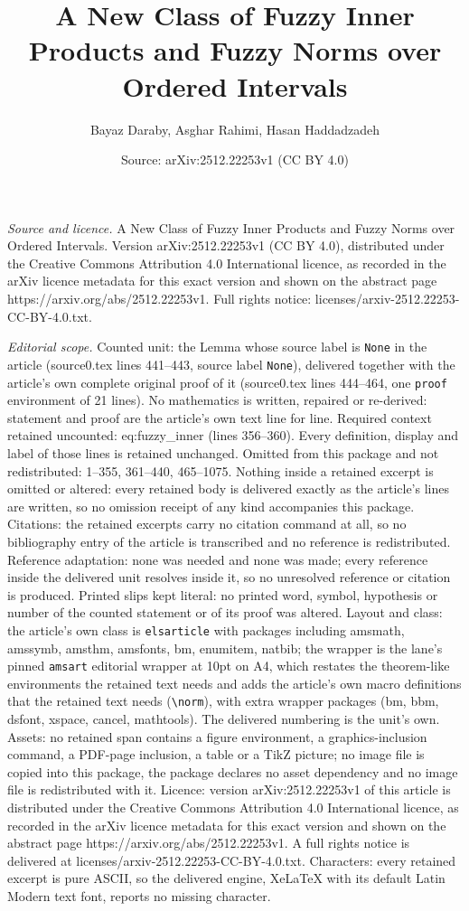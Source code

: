 \documentclass[10pt,a4paper]{amsart}
\title[A New Class of Fuzzy Inner Products and Fuzzy Norms over Ord]{A New Class of Fuzzy Inner Products and Fuzzy Norms over Ordered Intervals}
\author{Bayaz Daraby, Asghar Rahimi, Hasan Haddadzadeh}
\date{Source: arXiv:2512.22253v1 (CC BY 4.0)}
\begin{document}
\maketitle

\noindent\emph{Source and licence.} A New Class of Fuzzy Inner Products and Fuzzy Norms over Ordered Intervals. Version arXiv:2512.22253v1 (CC BY 4.0), distributed under the Creative Commons Attribution 4.0 International licence, as recorded in the arXiv licence metadata for this exact version and shown on the abstract page https://arxiv.org/abs/2512.22253v1. Full rights notice: licenses/arxiv-2512.22253-CC-BY-4.0.txt.\par\smallskip

\noindent\textit{Editorial scope.} Counted unit: the Lemma whose source label is \texttt{None} in the article (source0.tex lines 441--443, source label \texttt{None}), delivered together with the article's own complete original proof of it (source0.tex lines 444--464, one \texttt{proof} environment of 21 lines). No mathematics is written, repaired or re-derived: statement and proof are the article's own text line for line. Required context retained uncounted: eq:fuzzy\_inner (lines 356--360). Every definition, display and label of those lines is retained unchanged. Omitted from this package and not redistributed: 1--355, 361--440, 465--1075. Nothing inside a retained excerpt is omitted or altered: every retained body is delivered exactly as the article's lines are written, so no omission receipt of any kind accompanies this package. Citations: the retained excerpts carry no citation command at all, so no bibliography entry of the article is transcribed and no reference is redistributed. Reference adaptation: none was needed and none was made; every reference inside the delivered unit resolves inside it, so no unresolved reference or citation is produced. Printed slips kept literal: no printed word, symbol, hypothesis or number of the counted statement or of its proof was altered. Layout and class: the article's own class is \texttt{elsarticle} with packages including amsmath, amssymb, amsthm, amsfonts, bm, enumitem, natbib; the wrapper is the lane's pinned \texttt{amsart} editorial wrapper at 10pt on A4, which restates the theorem-like environments the retained text needs and adds the article's own macro definitions that the retained text needs (\texttt{\textbackslash norm}), with extra wrapper packages (bm, bbm, dsfont, xspace, cancel, mathtools). The delivered numbering is the unit's own. Assets: no retained span contains a figure environment, a graphics-inclusion command, a PDF-page inclusion, a table or a TikZ picture; no image file is copied into this package, the package declares no asset dependency and no image file is redistributed with it. Licence: version arXiv:2512.22253v1 of this article is distributed under the Creative Commons Attribution 4.0 International licence, as recorded in the arXiv licence metadata for this exact version and shown on the abstract page https://arxiv.org/abs/2512.22253v1. A full rights notice is delivered at licenses/arxiv-2512.22253-CC-BY-4.0.txt. Characters: every retained excerpt is pure ASCII, so the delivered engine, XeLaTeX with its default Latin Modern text font, reports no missing character.
\end{document}

